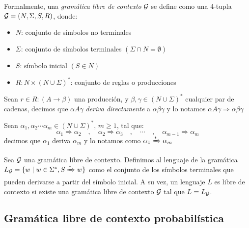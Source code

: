 \begin{definicion}[CFG]
Formalmente, una {\em gramática libre de contexto} $\gram$ se define como una 4-tupla $\gram = (N, \Sigma, S, R)$, donde:
\begin{itemize}
    \item $N$: conjunto de símbolos no terminales
    \item $\Sigma$: conjunto de símbolos terminales $(\Sigma \cap N = \emptyset)$
    \item $S$: símbolo inicial $(S \in N)$
    \item $R : N \times (N \cup \Sigma)^{\ast} $: conjunto de reglas o producciones 
\end{itemize}

\end{definicion}

\begin{definicion}
Sean $r \in R : (A \to \beta)$ una producción, y $\beta, \gamma \in (N \cup \Sigma)^{\ast}$ cualquier par de cadenas, decimos que $\alpha A \gamma$ {\em deriva directamente} a $\alpha \beta \gamma$ y lo notamos $\alpha A \gamma \Rightarrow \alpha \beta \gamma$
\end{definicion}

\begin{definicion}[Derivación]
Sean $\alpha_1, \alpha_2 \cdots \alpha_m \in (N \cup \Sigma)^{\ast}$, $m \geq 1$, tal que:
$$
\alpha_1 \Rightarrow \alpha_2\quad,\quad \alpha_2 \Rightarrow \alpha_3\quad,\quad \cdots\quad,\quad \alpha_{m-1} \Rightarrow \alpha_m
$$
decimos que $\alpha_1$ deriva $\alpha_m$ y lo notamos como $\alpha_1 \xRightarrow{\ast} \alpha_m$
\end{definicion}

\begin{definicion}
Sea $\gram$ una gramática libre de contexto. Definimos al lenguaje de la gramática $L_\gram = \{w \mid w \in \Sigma^{\ast}, S \xRightarrow{\ast} w \}$ como el conjunto de los símbolos terminales que pueden derivarse a partir del símbolo inicial. A su vez, un lenguaje $L$ es libre de contexto si existe una gramática libre de contexto $\gram$ tal que $L = L_\gram$.
\end{definicion}


\subsection{Gramática libre de contexto probabilística}

